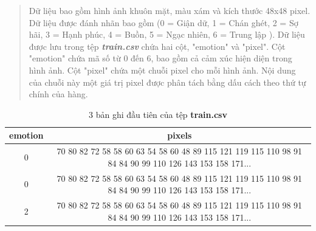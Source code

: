 \documentclass{article}
\begin{document}
\begin{quote}
   Dữ liệu bao gồm hình ảnh khuôn mặt, màu xám và kích thước 48x48 pixel.
   Dữ liệu được đánh nhãn bao gồm (0 = Giận dữ, 1 = Chán ghét, 2 = Sợ hãi, 3 = Hạnh phúc, 4 = Buồn, 5 = Ngạc nhiên, 6 = Trung lập ).
   Dữ liệu được lưu trong tệp \textbf{\textit{train.csv}} chứa hai cột, "emotion" và "pixel". 
   Cột "emotion" chứa mã số từ 0 đến 6, bao gồm cả cảm xúc hiện diện trong hình ảnh. 
   Cột "pixel" chứa một chuỗi pixel cho mỗi hình ảnh. 
   Nội dung của chuỗi này một giá trị pixel được phân tách bằng dấu cách theo thứ tự chính của hàng.
\end{quote}
\begin{table}[H]
   \centering
   \begin{tabular}{|c|c|}
      \hline
      emotion & pixels \\ \hline
      0 & 70 80 82 72 58 58 60 63 54 58 60 48 89 115 121 119 115 110 98 91 84 84 90 99 110 126 143 153 158 171... \\ \hline
      0 & 70 80 82 72 58 58 60 63 54 58 60 48 89 115 121 119 115 110 98 91 84 84 90 99 110 126 143 153 158 171... \\ \hline
      2 & 70 80 82 72 58 58 60 63 54 58 60 48 89 115 121 119 115 110 98 91 84 84 90 99 110 126 143 153 158 171... \\ \hline
   \end{tabular}
   \caption{3 bản ghi đầu tiên của tệp \textbf{train.csv}}
   \label{table:3example}
\end{table}
\end{document}
